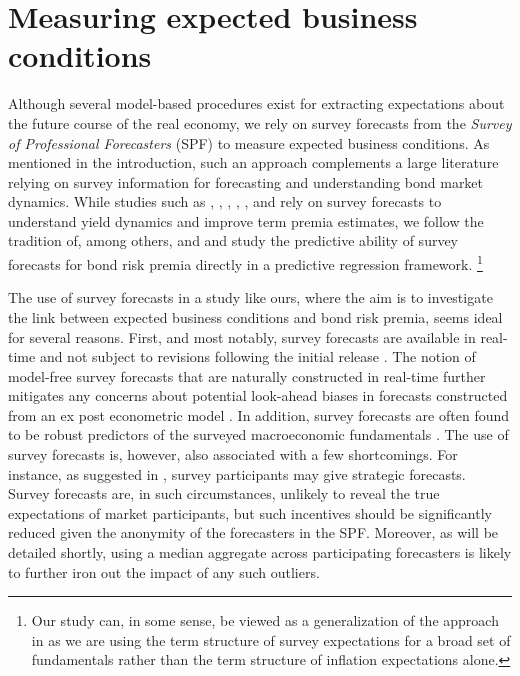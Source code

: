 \documentclass[12pt,letterpaper,leqno,doublespacing]{article}
\begin{document}
\section{Measuring expected business conditions}\label{Sec:e_measuring_ebc}
Although several model-based procedures exist for extracting expectations about the future course of the real economy, we rely on survey forecasts from the \emph{Survey of Professional Forecasters} (SPF) to measure expected business conditions. As mentioned in the introduction, such an approach complements a large literature relying on survey information for forecasting and understanding bond market dynamics. While studies such as \cite{Chun2011}, \cite{Wright2011}, \cite{ChernovMueller2012}, \cite{DickSchmelingSchrimpf2013}, \cite{PiazzesiSalomaoSchneider2013}, and \cite{JoslinPriebschSingleton2014} rely on survey forecasts to understand yield dynamics and improve term premia estimates, we follow the tradition of, among others, \cite{CochranePiazzesi2005} and \cite{LudvigsonNg2009} and study the predictive ability of survey forecasts for bond risk premia directly in a predictive regression framework.%
\footnote{Our study can, in some sense, be viewed as a generalization of the approach in \citet{ChernovMueller2012} as we are using the term structure of survey expectations for a broad set of fundamentals rather than the term structure of inflation expectations alone.}

The use of survey forecasts in a study like ours, where the aim is to investigate the link between expected business conditions and bond risk premia, seems ideal for several reasons. First, and most notably, survey forecasts are available in real-time and not subject to revisions following the initial release \citep{AmatoSwanson2001,CroushoreStark2001}. The notion of model-free survey forecasts that are naturally constructed in real-time further mitigates any concerns about potential look-ahead biases in forecasts constructed from an ex post econometric model \citep{PesaranTimmermann2005,CapistranTimmermann2009}. In addition, survey forecasts are often found to be robust predictors of the surveyed macroeconomic fundamentals \citep{FamaGibbons1984,Thomas1999,AngBekaertWei2007}. The use of survey forecasts is, however, also associated with a few shortcomings. For instance, as suggested in \cite{OttavianiSorensen2006}, survey participants may give strategic forecasts. Survey forecasts are, in such circumstances, unlikely to reveal the true expectations of market participants, but such incentives should be significantly reduced given the anonymity of the forecasters in the SPF. Moreover, as will be detailed shortly, using a median aggregate across participating forecasters is likely to further iron out the impact of any such outliers.
\end{document}
